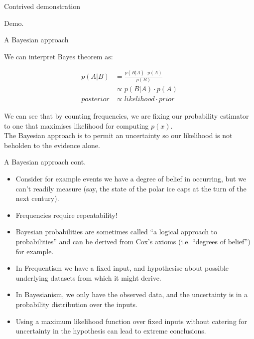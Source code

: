 \documentclass{beamer}
\begin{document}
\begin{frame}{Contrived demonstration}

  Demo.

\end{frame}

\begin{frame}{A Bayesian approach}

  We can interpret Bayes theorem as:

  \begin{align}
    p(A|B) &= \frac{p(B|A) \cdot p(A)}{p(B)} \nonumber \\
    &\propto p(B|A) \cdot p(A) \nonumber \\
    posterior &\propto likelihood \cdot prior \nonumber
  \end{align}

  We can see that by counting frequencies, we are fixing our
  probability estimator to one that maximises likelihood for computing
  $p(x)$. \\

  The Bayesian approach is to permit an uncertainty so our likelihood
  is not beholden to the evidence alone.

\end{frame}

\begin{frame}{A Bayesian approach cont.}

  \begin{itemize}
    \item Consider for example events we have a degree of belief in
      occurring, but we can't readily measure (say, the state of the
      polar ice caps at the turn of the next century).
    \item Frequencies require repeatability!
    \item Bayesian probabilities are sometimes called ``a logical
      approach to probabilities'' and can be derived from Cox's axioms
      (i.e. ``degrees of belief'') for example.
  \end{itemize}

\end{frame}

\begin{frame}

  \begin{itemize}
    \item In Frequentism we have a fixed input, and hypothesise about
      possible underlying datasets from which it might derive.
    \item In Bayesianism, we only have the observed data, and the
      uncertainty is in a probability distribution over the inputs.
    \item Using a maximum likelihood function over fixed inputs
      without catering for uncertainty in the hypothesis can lead to
      extreme conclusions.
  \end{itemize}

\end{frame}
\end{document}
